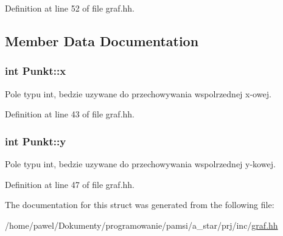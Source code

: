 Definition at line 52 of file graf.\-hh.



\subsection{Member Data Documentation}
\hypertarget{struct_punkt_a3c8936f679ef8fc4c1380ebc45820dc4}{
\subsubsection[{x}]{\setlength{\rightskip}{0pt plus 5cm}int Punkt\-::x}}\label{struct_punkt_a3c8936f679ef8fc4c1380ebc45820dc4}


Pole typu int, bedzie uzywane do przechowywania wspolrzednej x-\/owej. 



Definition at line 43 of file graf.\-hh.

\hypertarget{struct_punkt_a68c1591209ee35bec2189fb87cbe57bb}{
\subsubsection[{y}]{\setlength{\rightskip}{0pt plus 5cm}int Punkt\-::y}}\label{struct_punkt_a68c1591209ee35bec2189fb87cbe57bb}


Pole typu int, bedzie uzywane do przechowywania wspolrzednej y-\/kowej. 



Definition at line 47 of file graf.\-hh.



The documentation for this struct was generated from the following file\-:\begin{DoxyCompactItemize}
\item 
/home/pawel/\-Dokumenty/programowanie/pamsi/a\-\_\-star/prj/inc/\hyperlink{graf_8hh}{graf.\-hh}\end{DoxyCompactItemize}
